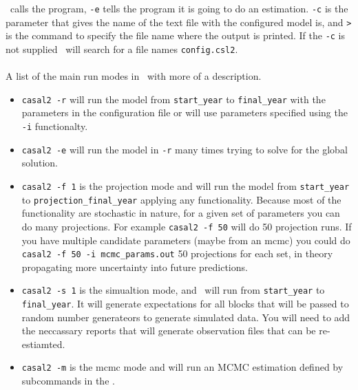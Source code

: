 \CNAME\ calls the program, \texttt{-e} tells the program it is going to do an estimation. \texttt{-c} is the parameter that gives the name of the text file with the configured model is, and \texttt{>} is the command to specify the file name where the output is printed. If the \texttt{-c} is not supplied \CNAME\ will search for a file names \texttt{config.csl2}.
\\\\
A list of the main run modes in \CNAME\ with more of a description.
\begin{itemize}
	
	\item \texttt{casal2 -r} will run the model from \texttt{start\_year} to \texttt{final\_year} with the parameters in the configuration file or will use parameters specified using the \texttt{-i} functionalty.
	
	\item \texttt{casal2 -e} will run the model in \texttt{-r} many times trying to solve for the global solution.
	
	\item \texttt{casal2 -f 1} is the projection mode and will run the model from \texttt{start\_year} to \texttt{projection\_final\_year} applying any  functionality. Because most of the  functionality are stochastic in nature, for a given set of parameters you can do many projections. For example \texttt{casal2 -f 50} will do 50 projection runs. If you have multiple candidate parameters (maybe from an mcmc) you could do \texttt{casal2 -f 50 -i mcmc\_params.out} 50 projections for each set, in theory propagating more uncertainty into future predictions.
	
	\item \texttt{casal2 -s 1} is the simualtion mode, and \CNAME\ will run from \texttt{start\_year} to \texttt{final\_year}. It will generate expectations for all  blocks that will be passed to random number generateors to generate simulated data. You will need to add the neccassary reports that will generate observation files that can be re-estiamted.
	
	\item \texttt{casal2 -m} is the mcmc mode and will run an MCMC estimation defined by subcommands in the .
\end{itemize}
